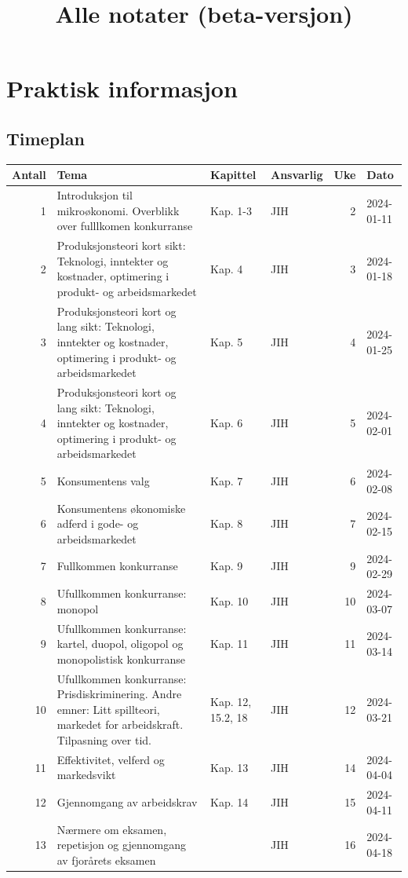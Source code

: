 \documentclass[
  letterpaper,
  DIV=11,
  numbers=noendperiod]{scrartcl}
\title{Alle notater (beta-versjon)}
\author{}
\date{}
\renewcommand*\contentsname{Table of contents}
\newcommand\contentsname{Table of contents}
\begin{document}
\maketitle

\renewcommand*\contentsname{Table of contents}
{
\hypersetup{linkcolor=}
\setcounter{tocdepth}{3}
\tableofcontents
}
\section{Praktisk informasjon}\label{praktisk-informasjon}

\subsection{Timeplan}\label{timeplan}

\begin{table}
\centering
\fontsize{16}{18}\selectfont
\begin{tabular}[t]{r|l|l|l|r|l}
\hline
Antall & Tema & Kapittel & Ansvarlig & Uke & Dato\\
\hline
1 & Introduksjon til mikroøkonomi. Overblikk over fulllkomen konkurranse & Kap. 1-3 & JIH & 2 & 2024-01-11\\
\hline
2 & Produksjonsteori kort sikt: Teknologi, inntekter og kostnader, optimering i produkt- og arbeidsmarkedet & Kap. 4 & JIH & 3 & 2024-01-18\\
\hline
3 & Produksjonsteori kort og lang sikt: Teknologi, inntekter og kostnader, optimering i produkt- og arbeidsmarkedet & Kap. 5 & JIH & 4 & 2024-01-25\\
\hline
4 & Produksjonsteori kort og lang sikt: Teknologi, inntekter og kostnader, optimering i produkt- og arbeidsmarkedet & Kap. 6 & JIH & 5 & 2024-02-01\\
\hline
5 & Konsumentens valg & Kap. 7 & JIH & 6 & 2024-02-08\\
\hline
6 & Konsumentens økonomiske adferd i gode- og arbeidsmarkedet & Kap. 8 & JIH & 7 & 2024-02-15\\
\hline
7 & Fullkommen konkurranse & Kap. 9 & JIH & 9 & 2024-02-29\\
\hline
8 & Ufullkommen konkurranse: monopol & Kap. 10 & JIH & 10 & 2024-03-07\\
\hline
9 & Ufullkommen konkurranse: kartel, duopol, oligopol og monopolistisk konkurranse & Kap. 11 & JIH & 11 & 2024-03-14\\
\hline
10 & Ufullkommen konkurranse: Prisdiskriminering. Andre emner: Litt spillteori, markedet for arbeidskraft. Tilpasning over tid. & Kap. 12, 15.2, 18 & JIH & 12 & 2024-03-21\\
\hline
11 & Effektivitet, velferd og markedsvikt & Kap. 13 & JIH & 14 & 2024-04-04\\
\hline
12 & Gjennomgang av arbeidskrav & Kap. 14 & JIH & 15 & 2024-04-11\\
\hline
13 & Nærmere om eksamen, repetisjon og gjennomgang av fjorårets eksamen &  & JIH & 16 & 2024-04-18\\
\hline
\end{tabular}
\end{table}
\end{document}
